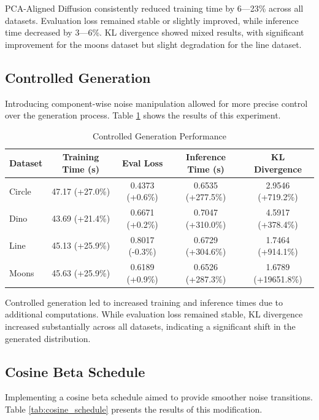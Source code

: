 \documentclass{article} %
\begin{document}
PCA-Aligned Diffusion consistently reduced training time by 6---23\% across all datasets. Evaluation loss remained stable or slightly improved, while inference time decreased by 3---6\%. KL divergence showed mixed results, with significant improvement for the moons dataset but slight degradation for the line dataset.

\subsection{Controlled Generation}
Introducing component-wise noise manipulation allowed for more precise control over the generation process. Table \ref{tab:controlled_gen} shows the results of this experiment.

\begin{table}[h]
\centering
\caption{Controlled Generation Performance}
\label{tab:controlled_gen}
\begin{tabular}{lcccc}
\hline
Dataset & Training Time (s) & Eval Loss & Inference Time (s) & KL Divergence \\
\hline
Circle & 47.17 (+27.0\%) & 0.4373 (+0.6\%) & 0.6535 (+277.5\%) & 2.9546 (+719.2\%) \\
Dino & 43.69 (+21.4\%) & 0.6671 (+0.2\%) & 0.7047 (+310.0\%) & 4.5917 (+378.4\%) \\
Line & 45.13 (+25.9\%) & 0.8017 (-0.3\%) & 0.6729 (+304.6\%) & 1.7464 (+914.1\%) \\
Moons & 45.63 (+25.9\%) & 0.6189 (+0.9\%) & 0.6526 (+287.3\%) & 1.6789 (+19651.8\%) \\
\hline
\end{tabular}
\end{table}

Controlled generation led to increased training and inference times due to additional computations. While evaluation loss remained stable, KL divergence increased substantially across all datasets, indicating a significant shift in the generated distribution.

\subsection{Cosine Beta Schedule}
Implementing a cosine beta schedule aimed to provide smoother noise transitions. Table \ref{tab:cosine_schedule} presents the results of this modification.
\end{document}
